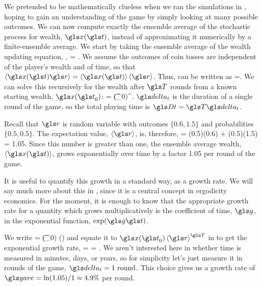 We pretended to be mathematically clueless when we ran the simulations in , hoping to gain an understanding of the game by simply looking at many possible outcomes. We can now compute exactly the ensemble average of the stochastic process for wealth, $\x(\t)$, instead of approximating it numerically by a finite-ensemble average. We start by taking the ensemble average of the wealth updating equation, ,
\be
\ave{\x(\t+\dt)} = \ave{\x(\t)\gr}.
\ee
We assume the outcomes of coin tosses are independent of the player's wealth and of time, so that $\ave{\x(\t)\gr} = \ave{\x(\t)}\ave{\gr}$. Thus,  can be written as
\be
\ave{\x(\t+\dt)}=\ave{\x(\t)}\ave{\gr}.
\ee
We can solve this recursively for the wealth after $\T$ rounds from a known starting wealth, $\x(\t_0)$:
\be
{} = \x(\t_0)\ave{\gr}^\T.
\ee
$\dt$ is the duration of a single round of the game, so the total playing time is $\Dt=\T\dt$.

Recall that $\gr$ is random variable with outcomes $\{0.6,1.5\}$ and probabilities $\{0.5,0.5\}$. The expectation value, $\ave{\gr}$, is, therefore,
\be
\ave{\gr} = (0.5)(0.6) + (0.5)(1.5) = 1.05.
\ee
Since this number is greater than one, the ensemble average wealth, $\ave{\x(\t)}$, grows exponentially over time by a factor 1.05 per round of the game.

It is useful to quantify this growth in a standard way, as a growth rate. We will say much more about this in , since it is a central concept in ergodicity economics. For the moment, it is enough to know that the appropriate growth rate for a quantity which grows multiplicatively is the coefficient of time, $\g$, in the exponential function, $\exp(\g\t)$.

We write
\be
{} = \x(\t_0) \exp(\ggave\Dt)
\ee
and equate it to $\x(\t_0)\ave{\gr}^\T$ in  to get the exponential growth rate,
\be
\ggave = \frac{\T\ln\ave{\gr}}{\Dt} = \frac{\ln\ave{\gr}}{\dt}.
\ee
We aren't interested here in whether time is measured in minutes, days, or years, so for simplicity let's just measure it in rounds of the game, \ie $\dt=1\text{ round}$. This choice gives us a growth rate of $\ggave = \ln(1.05)/1 \approx 4.9\%$ per round.

